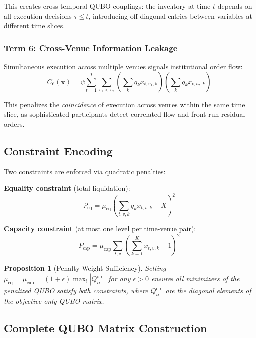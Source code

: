 \documentclass[11pt]{article}
\newcommand{\bx}{\mathbf{x}}
\newtheorem{proposition}[theorem]{Proposition}
\begin{document}
This creates cross-temporal QUBO couplings: the inventory at time $t$ depends on all execution decisions $\tau \leq t$, introducing off-diagonal entries between variables at different time slices.

\subsubsection{Term 6: Cross-Venue Information Leakage}

Simultaneous execution across multiple venues signals institutional order flow:
\begin{equation}
C_6(\bx) = \psi \sum_{t=1}^{T} \sum_{v_1 < v_2} \left(\sum_k q_k x_{t,v_1,k}\right)\left(\sum_k q_k x_{t,v_2,k}\right)
\label{eq:C6}
\end{equation}

This penalizes the \emph{coincidence} of execution across venues within the same time slice, as sophisticated participants detect correlated flow and front-run residual orders.

\subsection{Constraint Encoding}

Two constraints are enforced via quadratic penalties:

\textbf{Equality constraint} (total liquidation):
\begin{equation}
P_{\mathrm{eq}} = \mu_{\mathrm{eq}} \left(\sum_{t,v,k} q_k x_{t,v,k} - X\right)^2
\label{eq:P_eq}
\end{equation}

\textbf{Capacity constraint} (at most one level per time-venue pair):
\begin{equation}
P_{\mathrm{cap}} = \mu_{\mathrm{cap}} \sum_{t,v} \left(\sum_{k=1}^K x_{t,v,k} - 1\right)^2
\label{eq:P_cap}
\end{equation}

\begin{proposition}[Penalty Weight Sufficiency]
Setting $\mu_{\mathrm{eq}} = \mu_{\mathrm{cap}} = (1+\epsilon) \max_i |Q_{ii}^{\mathrm{obj}}|$ for any $\epsilon > 0$ ensures all minimizers of the penalized QUBO satisfy both constraints, where $Q_{ii}^{\mathrm{obj}}$ are the diagonal elements of the objective-only QUBO matrix.
\end{proposition}

\subsection{Complete QUBO Matrix Construction}
\end{document}
